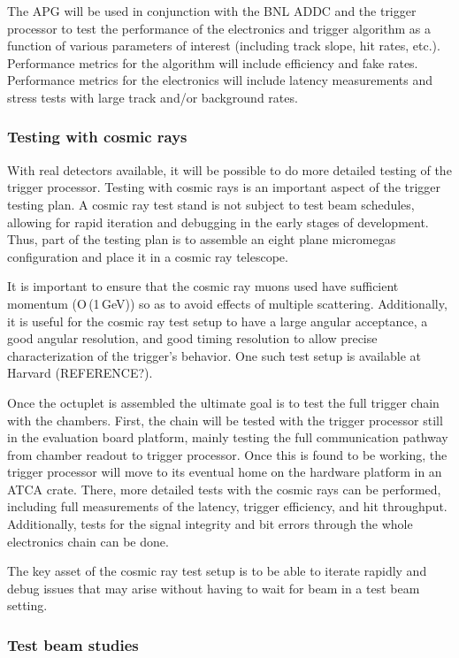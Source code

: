 The APG will be used in conjunction with the BNL ADDC and the trigger
processor to test the performance of the electronics and trigger
algorithm  as a function of various parameters of interest (including
track slope,  hit rates, etc.). Performance metrics for the algorithm
will include efficiency and fake rates. Performance metrics for the
electronics  will include latency measurements and stress tests with
large track and/or background rates.

\subsubsection{Testing with cosmic rays}

With real detectors available, it will be possible to do more detailed
testing of the trigger processor. Testing with cosmic rays is an
important aspect of the trigger testing plan.
A cosmic ray test stand is not subject to test beam schedules,
allowing for rapid iteration and debugging in the early stages of development.
Thus, part of the testing plan
is to assemble an eight plane micromegas configuration and place it in
a cosmic ray telescope.

It is important to ensure that
the cosmic ray muons used have sufficient momentum (O\,(1\,GeV)) so as
to avoid effects of multiple scattering. Additionally, it is useful
for the cosmic ray test setup to have a large angular acceptance, a
good angular resolution, and good timing resolution to allow precise
characterization of the trigger's behavior. One such test setup is
available at Harvard (REFERENCE?).

Once the octuplet is assembled the ultimate goal is to test the full
trigger chain with the chambers. First, the chain will be
tested with the trigger processor still in the evaluation board
platform, mainly testing the full communication pathway from chamber readout
to trigger processor. Once this is found to be working, the trigger
processor will move to its eventual home on the hardware platform in
an ATCA crate. There, more detailed tests with the cosmic rays can be
performed, including full measurements of the latency, trigger
efficiency, and hit throughput. Additionally, tests for the signal
integrity and bit errors through the whole electronics chain can be
done.

The key asset of the cosmic ray test setup is to be
able to iterate rapidly and debug issues that may arise without having
to wait for beam in a test beam setting.


\subsubsection{Test beam studies}


